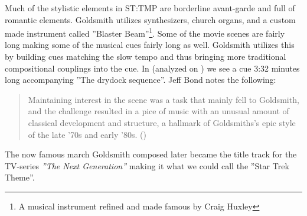 Much of the stylistic elements in \ac{ST:TMP} are borderline avant-garde and full of romantic elements. Goldsmith utilizes synthesizers, church organs, and a custom made instrument called ''Blaster Beam''\footnote{A musical instrument refined and made famous by Craig Huxley}. Some of the movie scenes are fairly long making some of the musical cues fairly long as well. Goldsmith utilizes this by building cues matching the slow tempo and thus bringing more traditional compositional couplings into the cue. In  (analyzed on \pageref{sec:leaving drydock}) we see a cue 3:32 minutes long accompanying ''The drydock sequence''. Jeff Bond notes the following: \blockquote{Maintaining interest in the scene was a task that mainly fell to Goldsmith, and the challenge resulted in a pice of music with an unusual amount of classical development and structure, a hallmark of Goldsmiths's epic style of the late '70s and early '80s. (\citealt[p.88]{bond_music_1998})} The now famous march Goldsmith composed later became the title track for the TV-series \textit{''The Next Generation''} making it what we could call the ''Star Trek Theme''.

